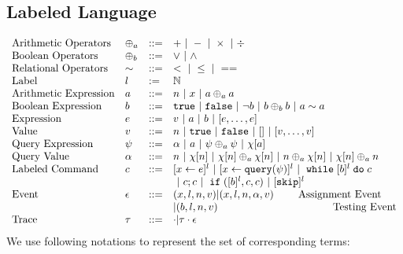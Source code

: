 %
%
\subsection{Labeled Language}
\[
\begin{array}{llll}
\mbox{Arithmetic Operators} 
& \oplus_a & ::= & + ~|~ - ~|~ \times 
%
~|~ \div \\  
\mbox{Boolean Operators} 
& \oplus_b & ::= & \lor ~|~ \land
\\
%
\mbox{Relational Operators} 
& \sim & ::= & < ~|~ \leq ~|~ == 
\\  
%
\mbox{Label} 
& l & := & \mathbb{N} 
\\ 
%
\mbox{Arithmetic Expression} 
& \aexpr & ::= & 
n ~|~ {x} ~|~ \aexpr \oplus_a \aexpr  
\\
%
\mbox{Boolean Expression} & \bexpr & ::= & 
%
\etrue ~|~ \efalse  ~|~ \neg \bexpr
 ~|~ \bexpr \oplus_b \bexpr
%
~|~ \aexpr \sim \aexpr 
\\
%
\mbox{Expression} & \expr & ::= & v ~|~ \aexpr \sep \bexpr ~|~ [\expr, \dots, \expr]
\\  
%
\mbox{Value} 
& v & ::= & { n \sep \etrue \sep \efalse ~|~ [] ~|~ [v, \dots, v]}  
\\
%
\mbox{Query Expression} 
& {\qexpr} & ::= 
& { \qval ~|~ \aexpr ~|~ \qexpr \oplus_a \qexpr ~|~ \chi[\aexpr]} 
\\
%
\mbox{Query Value} & \qval & ::= 
& {n ~|~ \chi[n] ~|~ \chi[n] \oplus_a  \chi[n] ~|~ n \oplus_a  \chi[n]
~|~ \chi[n] \oplus_a  n}
\\
%
\mbox{Labeled Command} 
& {c} & ::= &   [\assign {{x}}{ {\expr}}]^{l} ~|~  [\assign {{x} } {{\query(\qexpr)}}]^{l}
~|~ {\ewhile [ \bexpr ]^{l} \edo {c} }
\\
&&&
~|~ {c};{c}  
~|~ \eif([\bexpr]{}^l , {c}, {c}) 
~|~ [\eskip]^{l} 
\\
%
\mbox{Event} 
& \event & ::= & 
    ({x}, l, n, v) | ({x}, l, n, \qval, v)  ~~~~~~~ \mbox{Assignment Event} \\
&&& | (\bexpr, l, n, v)   ~~~~~~~~~~~~~~~~~~~~~~~~~~~~~~~~~ \mbox{Testing Event}
\\
%
\mbox{Trace} & \vtrace
& ::= & \cdot | \vtrace \cdot \event
\end{array}
\]
We use following notations to represent the set of corresponding terms:
